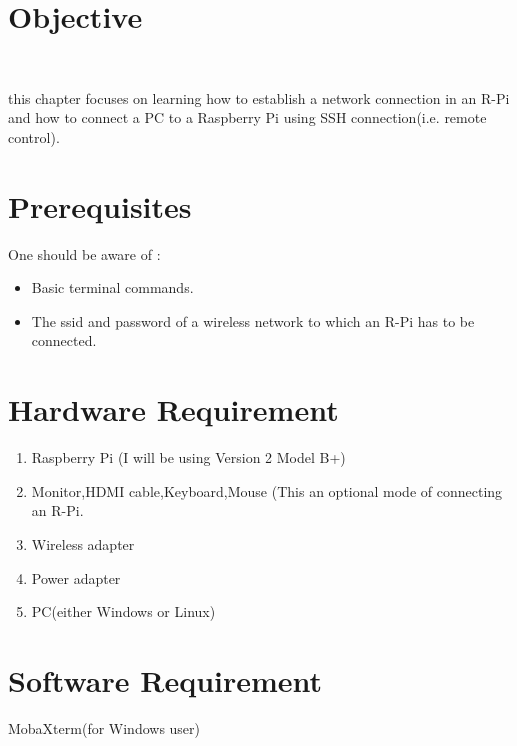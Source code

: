\documentclass[11pt,a4paper]{report}
\begin{document}
	\section{Objective}\
	\begin{flushleft}
	this chapter focuses on learning how to establish a network connection in an R-Pi and how to connect a PC to a Raspberry Pi using SSH connection(i.e. remote control).
	
	\section{Prerequisites}
	One should be aware of :
	\begin{itemize}
		\item Basic terminal commands.
		\item The ssid and password of a wireless network to which an R-Pi has to be connected.
	\end{itemize}
	
	\section{Hardware Requirement}
	\begin{enumerate}
		\item Raspberry Pi (I will be using Version 2 Model B+)
		\item Monitor,HDMI cable,Keyboard,Mouse (This an optional mode of connecting an R-Pi.
		\item Wireless adapter
		\item Power adapter
		\item PC(either Windows or Linux)
	\end{enumerate}
		
	\section{Software Requirement}
	MobaXterm(for Windows user)
	
	\newpage

\end{flushleft}
\end{document}

